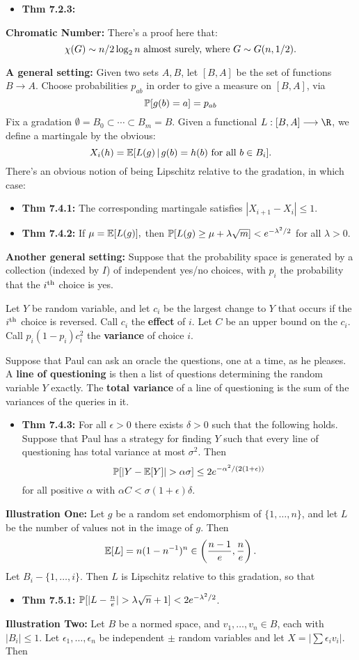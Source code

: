 \documentclass[11pt]{article}
\newenvironment{INT}[1][]{\begin{itemize}\small\item\textbf{#1}}{\end{itemize}}
\newcommand{\moreINT}[1][]{\item\textbf{#1}}
\begin{document}
\begin{chapter7}
\begin{itemise}
\begin{INT}[Thm 7.2.3:]
\end{INT}
\item \textbf{Chromatic Number:} There's a proof here that:
\[\chi(G)\sim n/2\log_2n\textup{ almost surely, where $G\sim G(n,1/2)$}.\]
\item \textbf{A general setting:}
Given two sets $A,B$, let $[B,A]$ be the set of functions $B\to A$. Choose probabilities $p_{ab}$ in order to give a measure on {$[B,A]$}, via
\[\operatorname{\mathbb{P}}[g(b)=a]=p_{ab}\]
Fix a gradation $\emptyset=B_0\subset\cdots\subset B_m=B$. Given a functional $L:[B,A]\to \R$, we define a martingale by the obvious:
\[X_i(h)=\operatorname{\mathbb{E}}[L(g)\,|\,g(b)=h(b)\textup{ for all }b\in B_i].\]
There's an obvious notion of being Lipschitz relative to the gradation, in which case:
\begin{INT}[Thm 7.4.1:]
The corresponding martingale satisfies $|X_{i+1}-X_i|\leq1$.
\moreINT[Thm 7.4.2:]
If $\mu=\operatorname{\mathbb{E}}[L(g)],$ then $\operatorname{\mathbb{P}}[L(g)\geq\mu+\lambda\sqrt m]<e^{-\lambda^2/2}$ for all $\lambda>0$.
\end{INT}
\item \textbf{Another general setting:}
Suppose that the probability space is generated by a collection (indexed by $I$) of independent yes/no choices, with $p_i$ the probability that the $i^\textup{th}$ choice is yes.

\INDENT Let $Y$ be random variable, and let $c_i$ be the largest change to $Y$ that occurs if the $i^\textup{th}$ choice is reversed. Call $c_i$ the \textbf{effect} of $i$. Let $C$ be an upper bound on the $c_i$. Call $p_i(1-p_i)c_i^2$ the \textbf{variance} of choice $i$.

\INDENT  Suppose that Paul can ask an oracle the questions, one at a time, as he pleases. A \textbf{line of questioning} is then a list of questions determining the random variable $Y$ exactly. The \textbf{total variance} of a line of questioning is the sum of the variances of the queries in it.
\begin{INT}[Thm 7.4.3:]
For all $\epsilon>0$ there exists $\delta>0$ such that the following holds. Suppose that Paul has a strategy for finding $Y$ such that every line of questioning has total variance at most $\sigma^2$. Then
\[\Prob[|Y-\Exp[Y]|>\alpha\sigma]\leq2e^{-\alpha^2/(2(1+\epsilon))}\]
for all positive $\alpha$ with $\alpha C<\sigma(1+\epsilon)\delta$.
\end{INT}
\item \textbf{Illustration One:} Let $g$ be a random set endomorphism of $\{1,\ldots,n\}$, and let $L$ be the number of values not in the image of $g$. Then
\[\operatorname{\mathbb{E}}[L]=n(1-n^{-1})^n\in\left(\frac{n-1}{e},\frac{n}{e}\right).\]
Let $B_i-\{1,\ldots,i\}$. Then $L$ is Lipschitz relative to this gradation, so that
\begin{INT}[Thm 7.5.1:]
$\Prob[|L-\frac{n}{e}|>\lambda\sqrt n+1]<2e^{-\lambda^2/2}$.
\end{INT}
\item \textbf{Illustration Two:} Let $B$ be a normed space, and $v_1,\ldots,v_n\in B$, each with $|B_i|\leq1$. Let $\epsilon_1,\ldots,\epsilon_n$ be independent $\pm$ random variables and let $X=|\sum\epsilon_iv_i|$. Then
\end{itemise}
\end{chapter7}
\end{document}
